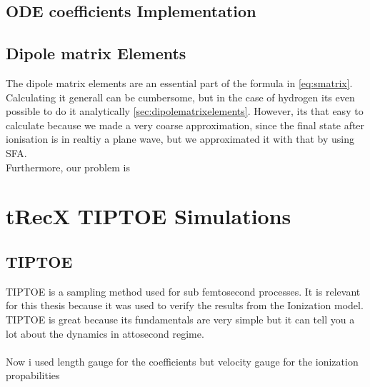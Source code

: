 \subsection{ODE coefficients Implementation}




\subsection{Dipole matrix Elements}
The dipole matrix elements are an essential part of the formula in \eqref{eq:smatrix}. 
Calculating it generall can be cumbersome, but in the case of hydrogen its even possible to do it analytically \ref{sec:dipolematrixelements}.
However, its that easy to calculate because we made a very coarse approximation, since the final state after ionisation is in realtiy a plane wave, but we approximated it with that by using SFA.\\
Furthermore, our problem is 






\section{tRecX TIPTOE Simulations}
\subsection{TIPTOE}
TIPTOE \cite{Park:18} is a sampling method used for sub femtosecond processes. It is relevant for this thesis because it was used to verify the results from the Ionization model. 
TIPTOE is great because its fundamentals are very simple but it can tell you a lot about the dynamics in attosecond regime. \\\\

Now i used length gauge for the coefficients but velocity gauge for the ionization propabilities





